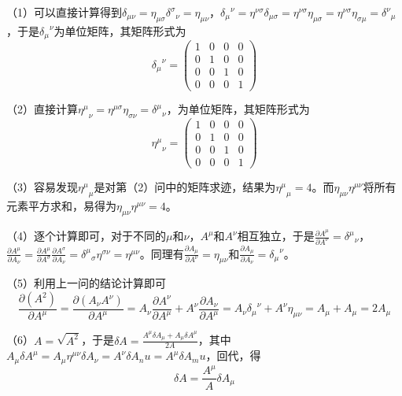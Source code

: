 \begin{solution}
	（1）可以直接计算得到\(\delta_{\mu\nu}=\eta_{\mu\sigma}{\delta^\sigma}_\nu=\eta_{\mu\nu}\)，\({\delta_\mu}^\nu=\eta^{\nu\sigma}\delta_{\mu\sigma}=\eta^{\nu\sigma}\eta_{\mu\sigma}=\eta^{\nu\sigma}\eta_{\sigma\mu}={\delta^\nu}_\mu\)，于是\({\delta_\mu}^\nu\)为单位矩阵，其矩阵形式为
	\begin{equation*}
		{\delta_\mu}^\nu=
		\begin{pmatrix}
			1 & 0 & 0 & 0\\
			0 & 1 & 0 & 0\\
			0 & 0 & 1 & 0\\
			0 & 0 & 0 & 1
		\end{pmatrix}
	\end{equation*}
	
	（2）直接计算\({\eta^\mu}_\nu=\eta^{\mu\sigma}\eta_{\sigma\nu}={\delta^\mu}_\nu\)，为单位矩阵，其矩阵形式为
	\begin{equation*}
		{\eta^\mu}_\nu=
		\begin{pmatrix}
			1 & 0 & 0 & 0\\
			0 & 1 & 0 & 0\\
			0 & 0 & 1 & 0\\
			0 & 0 & 0 & 1
		\end{pmatrix}
	\end{equation*}
	
	（3）容易发现\({\eta^\mu}_{\mu}\)是对第（2）问中的矩阵求迹，结果为\({\eta^\mu}_{\mu}=4\)。而\(\eta_{\mu\nu} \eta^{\mu\nu}\)将所有元素平方求和，易得为\(\eta_{\mu\nu} \eta^{\mu\nu}=4\)。
	
	（4）逐个计算即可，对于不同的\(\mu\)和\(\nu\)，\(A^\mu\)和\(A^\nu\)相互独立，于是\(\frac{\partial A^\mu}{\partial A^\nu}={\delta^\mu}_\nu\)，\(\frac{\partial A^\mu}{\partial A_\nu}=\frac{\partial A^\mu}{\partial A^\sigma}\frac{\partial A^\sigma}{\partial A_\nu}={\delta^\mu}_\sigma \eta^{\sigma\nu}=\eta^{\mu\nu}\)。同理有\(\frac{\partial A_\mu}{\partial A^\nu}=\eta_{\mu\nu}\)和\(\frac{\partial A_\mu}{\partial A_\nu}={\delta_\mu}^\nu\)。
	
	（5）利用上一问的结论计算即可
	\[\frac{\partial(A^2)}{\partial A^\mu}=\frac{\partial(A_\nu A^\nu)}{\partial A^\mu}=A_\nu \frac{\partial A^\nu}{\partial A^\mu}+A^\nu \frac{\partial A_\nu}{\partial A^\mu}=A_\nu {\delta_\mu}^{\nu}+A^\nu \eta_{\mu \nu}=A_\mu+A_\mu=2 A_\mu\]
	
	（6）\(A=\sqrt{A^2}\)，于是\(\delta A=\frac{A^\mu \delta A_\mu+A_\mu \delta A^\mu}{2 A}\)，其中\(A_\mu \delta A^\mu=A_\mu \eta^{\mu\nu}\delta A_\nu=A^\nu \delta A_nu=A^\mu \delta A_mu\)，回代，得
	\[\delta A=\frac{A^\mu }{A}\delta A_\mu\]
\end{solution}

